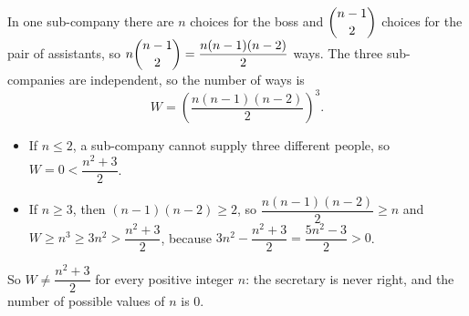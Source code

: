 In one sub-company there are $n$ choices for the boss and $\dbinom{n-1}{2}$ choices for the pair of assistants, so $n\dbinom{n-1}{2}=\dfrac{n(n-1)(n-2)}{2}$ ways. The three sub-companies are independent, so the number of ways is
\[W=\left(\dfrac{n(n-1)(n-2)}{2}\right)^3.\]
\begin{itemize}
\item If $n\le2$, a sub-company cannot supply three different people, so $W=0<\dfrac{n^2+3}{2}$.
\item If $n\ge3$, then $(n-1)(n-2)\ge2$, so $\dfrac{n(n-1)(n-2)}{2}\ge n$ and $W\ge n^3\ge3n^2>\dfrac{n^2+3}{2}$, because $3n^2-\dfrac{n^2+3}{2}=\dfrac{5n^2-3}{2}>0$.
\end{itemize}
So $W\ne\dfrac{n^2+3}{2}$ for every positive integer $n$: the secretary is never right, and the number of possible values of $n$ is $\boxed{0}$.
